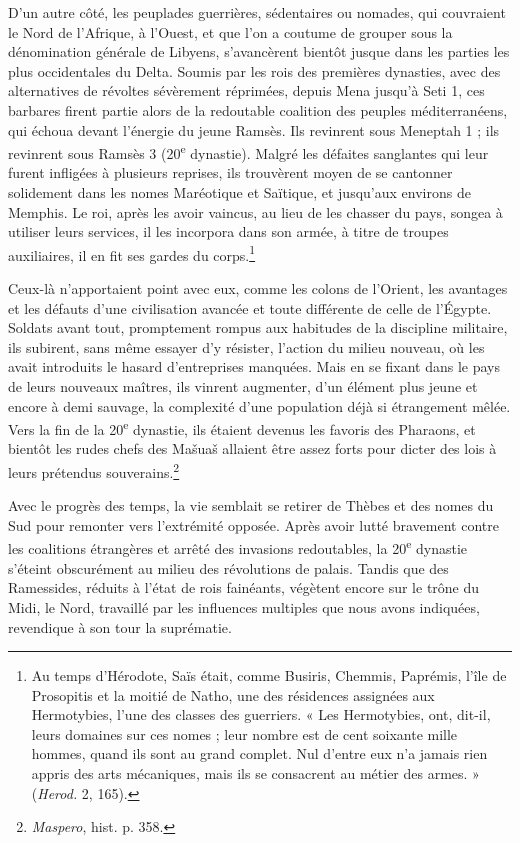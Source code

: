 \documentclass[letterpaper,twocolumn,openany,nodeprecatedcode]{dndbook}
\begin{document}
D'un autre côté, les peuplades guerrières, sédentaires ou nomades, qui couvraient le Nord de l'Afrique, à l'Ouest, et que l'on a coutume de grouper sous la dénomination générale de Libyens, s'avancèrent bientôt jusque dans les parties les plus occidentales du Delta. Soumis par les rois des premières dynasties, avec des alternatives de révoltes sévèrement réprimées, depuis Mena jusqu'à Seti 1, ces barbares firent partie alors de la redoutable coalition des peuples méditerranéens, qui échoua devant l'énergie du jeune Ramsès. Ils revinrent sous Meneptah 1 ; ils revinrent sous Ramsès 3 (20\textsuperscript{e} dynastie). Malgré les défaites sanglantes qui leur furent infligées à plusieurs reprises, ils trouvèrent moyen de se cantonner solidement dans les nomes Maréotique et Saïtique, et jusqu'aux environs de Memphis. Le roi, après les avoir vaincus, au lieu de les chasser du pays, songea à utiliser leurs services, il les incorpora dans son armée, à titre de troupes auxiliaires, il en fit ses gardes du corps.\footnote{Au temps d'Hérodote, Saïs était, comme Busiris, Chemmis, Paprémis, l'île de Prosopitis et la moitié de Natho, une des résidences assignées aux Hermotybies, l'une des classes des guerriers. « Les Hermotybies, ont, dit-il, leurs domaines sur ces nomes ; leur nombre est de cent soixante mille hommes, quand ils sont au grand complet. Nul d'entre eux n'a jamais rien appris des arts mécaniques, mais ils se consacrent au métier des armes. » (\emph{Herod.} 2, 165).}

Ceux-là n'apportaient point avec eux, comme les colons de l'Orient, les avantages et les défauts d'une civilisation avancée et toute différente de celle de l'Égypte. Soldats avant tout, promptement rompus aux habitudes de la discipline militaire, ils subirent, sans même essayer d'y résister, l'action du milieu nouveau, où les avait introduits le hasard d'entreprises manquées. Mais en se fixant dans le pays de leurs nouveaux maîtres, ils vinrent augmenter, d'un élément plus jeune et encore à demi sauvage, la complexité d'une population déjà si étrangement mêlée. Vers la fin de la 20\textsuperscript{e} dynastie, ils étaient devenus les favoris des Pharaons, et bientôt les rudes chefs des Mašuaš allaient être assez forts pour dicter des lois à leurs prétendus souverains.\footnote{\emph{Maspero}, hist. p. 358.}

Avec le progrès des temps, la vie semblait se retirer de Thèbes et des nomes du Sud pour remonter vers l'extrémité opposée. Après avoir lutté bravement contre les coalitions étrangères et arrêté des invasions redoutables, la 20\textsuperscript{e} dynastie s'éteint obscurément au milieu des révolutions de palais. Tandis que des Ramessides, réduits à l'état de rois fainéants, végètent encore sur le trône du Midi, le Nord, travaillé par les influences multiples que nous avons indiquées, revendique à son tour la suprématie.
\end{document}
